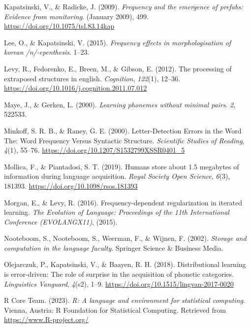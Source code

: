 \documentclass[
  man,floatsintext]{apa6}
\newlength{\cslhangindent}
\newenvironment{CSLReferences}[2] %
 {\begin{list}{}{%
  \setlength{\itemindent}{0pt}
  \setlength{\leftmargin}{0pt}
  \setlength{\parsep}{0pt}
  \ifodd #1
   \setlength{\leftmargin}{\cslhangindent}
   \setlength{\itemindent}{-1\cslhangindent}
  \fi
  \setlength{\itemsep}{#2\baselineskip}}}
 {\end{list}}
\begin{document}
\begin{CSLReferences}{1}{0}
Kapatsinski, V., \& Radicke, J. (2009). \emph{Frequency and the emergence of prefabs: Evidence from monitoring}. (January 2009), 499. \url{https://doi.org/10.1075/tsl.83.14kap}

Lee, O., \& Kapatsinski, V. (2015). \emph{Frequency effects in morphologisation of korean /n/-epenthesis}. 1--23.

Levy, R., Fedorenko, E., Breen, M., \& Gibson, E. (2012). The processing of extraposed structures in english. \emph{Cognition}, \emph{122}(1), 12--36. \url{https://doi.org/10.1016/j.cognition.2011.07.012}

Maye, J., \& Gerken, L. (2000). \emph{Learning phonemes without minimal pairs}. \emph{2}, 522533.

Minkoff, S. R. B., \& Raney, G. E. (2000). Letter-Detection Errors in the Word The: Word Frequency Versus Syntactic Structure. \emph{Scientific Studies of Reading}, \emph{4}(1), 55--76. \url{https://doi.org/10.1207/S1532799XSSR0401_5}

Mollica, F., \& Piantadosi, S. T. (2019). Humans store about 1.5 megabytes of information during language acquisition. \emph{Royal Society Open Science}, \emph{6}(3), 181393. \url{https://doi.org/10.1098/rsos.181393}

Morgan, E., \& Levy, R. (2016). Frequency-dependent regularization in iterated learning. \emph{The Evolution of Language: Proceedings of the 11th International Conference (EVOLANGX11)}, (2015).

Nooteboom, S., Nooteboom, S., Weerman, F., \& Wijnen, F. (2002). \emph{Storage and computation in the language faculty}. Springer Science \& Business Media.

Olejarczuk, P., Kapatsinski, V., \& Baayen, R. H. (2018). Distributional learning is error-driven: The role of surprise in the acquisition of phonetic categories. \emph{Linguistics Vanguard}, \emph{4}(s2), 1--9. \url{https://doi.org/10.1515/lingvan-2017-0020}

R Core Team. (2023). \emph{R: A language and environment for statistical computing}. Vienna, Austria: R Foundation for Statistical Computing. Retrieved from \url{https://www.R-project.org/}


\end{CSLReferences}
\end{document}
